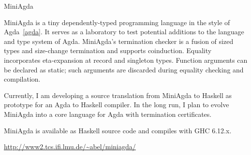 \begin{hcarentry}{MiniAgda}
\makeheader

MiniAgda is a tiny dependently-typed programming language in the style
of Agda~\cref{agda}. It serves as a laboratory to test potential additions to the
language and type system of Agda. MiniAgda's termination checker is a
fusion of sized types and size-change termination and supports
coinduction. Equality incorporates eta-expansion at record and
singleton types. Function arguments can be declared as static; such
arguments are discarded during equality checking and compilation.

Currently, I am developing a source translation from MiniAgda to
Haskell as prototype for an Agda to Haskell compiler. In the long
run, I plan to evolve MiniAgda into a core language for Agda with
termination certificates.

MiniAgda is available as Haskell source code and compiles with GHC
6.12.x. 

\FurtherReading
  \url{http://www2.tcs.ifi.lmu.de/\~abel/miniagda/}
\end{hcarentry}
